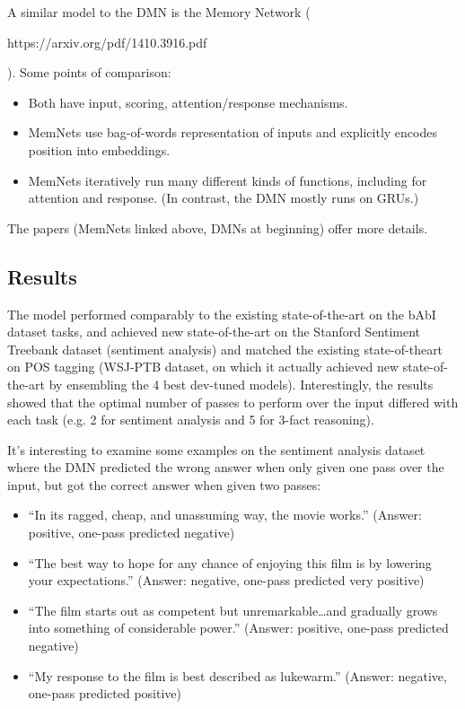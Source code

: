 A similar model to the DMN is the Memory Network (\begin{tt}https://arxiv.org/pdf/1410.3916.pdf\end{tt}). Some points of comparison:
\begin{itemize} 
\item Both have input, scoring, attention/response mechanisms.
\item MemNets use bag-of-words representation of inputs and explicitly encodes position into embeddings.
\item MemNets iteratively run many different kinds of functions, including for attention and response. (In contrast, the DMN mostly runs on GRUs.)
\end{itemize}
The papers (MemNets linked above, DMNs at beginning) offer more details.

\subsection{Results}
The model performed comparably to the existing state-of-the-art on the bAbI dataset tasks, and achieved new state-of-the-art on the Stanford Sentiment Treebank dataset (sentiment analysis) and matched the existing state-of-theart on POS tagging (WSJ-PTB dataset, on which it actually achieved new state-of-the-art by ensembling the 4 best dev-tuned models). Interestingly, the results showed that the optimal number of passes to perform over the input differed with each task (e.g. 2 for sentiment analysis and 5 for 3-fact reasoning).

It's interesting to examine some examples on the sentiment analysis dataset where the DMN predicted the wrong answer when only given one pass over the input, but got the correct answer when given two passes:
\begin{itemize}
\item ``In its ragged, cheap, and unassuming way, the movie works.” (Answer: positive, one-pass predicted negative)
\item ``The best way to hope for any chance of enjoying this film is by lowering your expectations.” (Answer: negative, one-pass predicted very positive)
\item ``The film starts out as competent but unremarkable…and gradually grows into something of considerable power.” (Answer: positive, one-pass predicted negative)
\item ``My response to the film is best described as lukewarm.” (Answer: negative, one-pass predicted positive)
\end{itemize}

